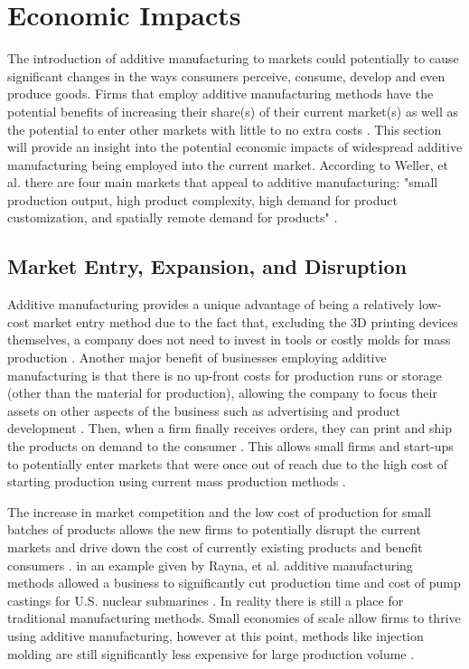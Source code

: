 \section{Economic Impacts}
	The introduction of additive manufacturing to markets could potentially to cause significant changes in the ways consumers perceive, consume, develop and even produce goods. Firms that employ additive manufacturing methods have the potential benefits of increasing their share(s) of their current market(s) as well as the potential to enter other markets with little to no extra costs \citep{Weller2015, Rayna2016}. This section will provide an insight into the potential economic impacts of widespread additive manufacturing being employed into the current market. According to Weller, et al. there are four main markets that appeal to additive manufacturing: "small production output, high product complexity, high demand for product customization, and spatially remote demand for products" \citep{Weller2015}.

\subsection{Market Entry, Expansion, and Disruption}
	Additive manufacturing provides a unique advantage of being a relatively low-cost market entry method due to the fact that, excluding the 3D printing devices themselves, a company does not need to invest in tools or costly molds for mass production \citep{Weller2015, Rayna2016}. Another major benefit of businesses employing additive manufacturing is that there is no up-front costs for production runs or storage (other than the material for production), allowing the company to focus their assets on other aspects of the business such as advertising and product development \citep{Rayna2016}. Then, when a firm finally receives orders, they can print and ship the products on demand to the consumer \citep{Rayna2016}. This allows small firms and start-ups to potentially enter markets that were once out of reach due to the high cost of starting production using current mass production methods \citep{Rayna2016}.\par
	The increase in market competition and the low cost of production for small batches of products allows the new firms to potentially disrupt the current markets and drive down the cost of currently existing products and benefit consumers \citep{Weller2015, Rayna2016}. in an example given by Rayna, et al. additive manufacturing methods allowed a business to significantly cut production time and cost of pump castings for U.S. nuclear submarines \citep{Rayna2016}. In reality there is still a place for traditional manufacturing methods. Small economies of scale allow firms to thrive using additive manufacturing, however at this point, methods like injection molding are still significantly less expensive for large production volume \citep{Weller2015}.

